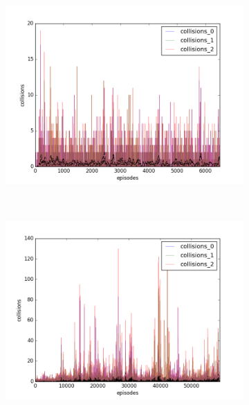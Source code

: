 \begin{figure}[t]
  \vspace{-0.5cm}
  \begin{subfigure}[t]{\figscale\linewidth}
    \hspace*{-2.75cm}
    \includegraphics[width=1.5\textwidth]
    {../results/dqn_1vs2/collisions.png}
    \label{fig:dqn-1vs2-collisions}
  \end{subfigure}
  ~
  \begin{subfigure}[t]{\figscale\linewidth}
    \hspace*{-1.4cm}
    \includegraphics[width=1.5\textwidth]
    {../results/ddpg_1vs2/collisions.png}
    \label{fig:ddpg-1vs2-collisions}
  \end{subfigure}
  ~
  \begin{subfigure}[t]{\figscale\linewidth}

\end{subfigure}
\end{figure}
